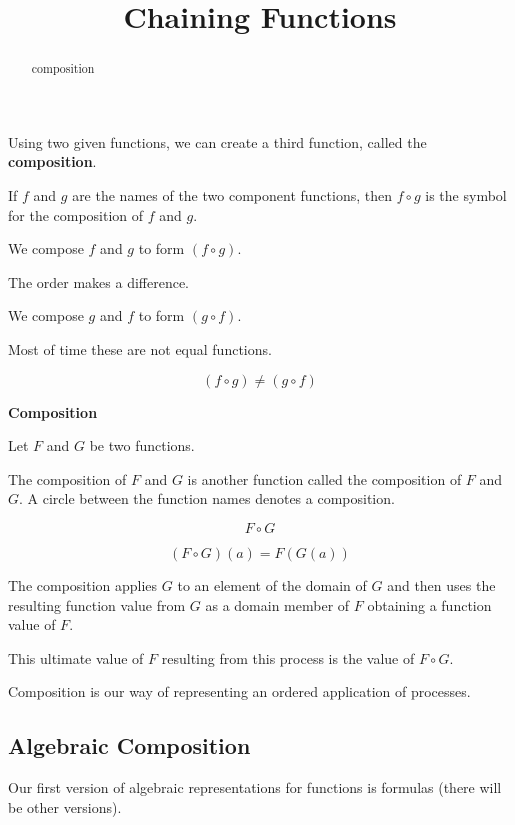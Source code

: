 \documentclass{ximera}
\title{Chaining Functions}
\begin{document}
\begin{abstract}
composition
\end{abstract}
\maketitle





Using two given functions, we can create a third function, called the \textbf{composition}.

If $f$ and $g$ are the names of the two component functions, then $f \circ g$ is the symbol for the composition of $f$ and $g$.

We compose $f$ and $g$ to form $(f \circ g)$.

The order makes a difference.

We compose $g$ and $f$ to form $(g \circ f)$.


Most of time these are not equal functions.

\[
(f \circ g) \ne (g \circ f)
\]


\begin{idea} \textbf{\textcolor{blue!55!black}{Composition}}


Let $F$ and $G$ be two functions.

The composition of $F$ and $G$ is another function called the composition of $F$ and $G$.  A circle between the function names denotes a composition.

\[
F \circ G
\]


\[
(F \circ G)(a) = F(G(a))
\]


The composition applies $G$ to an element of the domain of $G$ and then uses the resulting function value from $G$ as a domain member of $F$ obtaining a function value of $F$.

This ultimate value of $F$ resulting from this process is the value of $F \circ G$.

\end{idea}



Composition is our way of representing an ordered application of processes.



\subsection*{Algebraic Composition}


Our first version of algebraic representations for functions is formulas (there will be other versions).
\end{document}
